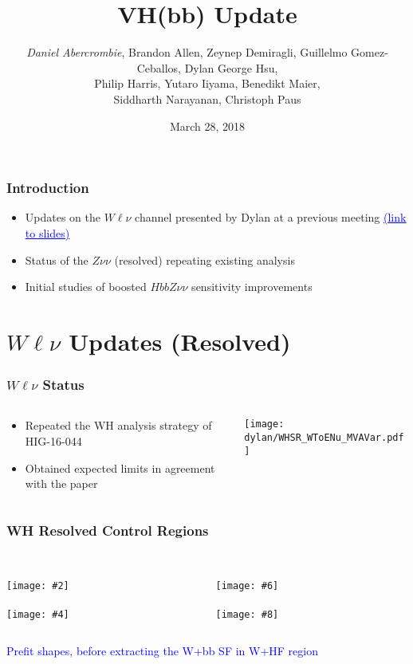 \documentclass{beamer}
\author[D. Abercrombie]{
  \emph{Daniel Abercrombie}, Brandon Allen, Zeynep Demiragli,
  Guillelmo Gomez-Ceballos, Dylan George Hsu, \\
  Philip Harris, Yutaro Iiyama, Benedikt Maier, \\
  Siddharth Narayanan, Christoph Paus
}
\title{\bf \sffamily VH(bb) Update}
\date{March 28, 2018}
\newcommand{\link}[2]{\href{#2}{\textcolor{blue}{\underline{#1}}}}
\newcommand{\wfourfigs}[8]{
  \begin{columns}
    \begin{column}{0.45\linewidth}
      \centering
      \textcolor{blue}{#1} \\
      \texttt{[image: \#2]} \\
      \textcolor{blue}{#3} \\
      \texttt{[image: \#4]}
    \end{column}
    \begin{column}{0.45\linewidth}
      \centering
      \textcolor{blue}{#5} \\
      \texttt{[image: \#6]} \\
      \textcolor{blue}{#7} \\
      \texttt{[image: \#8]}
    \end{column}
  \end{columns}
}
\begin{document}
\begin{frame}[nonumbering]
  \titlepage

\end{frame}

\begin{frame}
  \frametitle{Introduction}
  \begin{itemize}
  \item Updates on the $W\ell\nu$ channel presented by Dylan at a previous meeting
    \link{(link to slides)}{https://indico.cern.ch/event/690727/contributions/2890780/attachments/1603908/2545128/2018-02-21_statusReportVH.pdf}
  \item Status of the $Z\nu\nu$ (resolved) repeating existing analysis
  \item Initial studies of boosted $HbbZ\nu\nu$ sensitivity improvements
  \end{itemize}
\end{frame}

\section{$W\ell\nu$ Updates (Resolved)}

\begin{frame}
  \frametitle{$W\ell\nu$ Status}

  \begin{columns}
    \begin{column}{0.4\linewidth}
      \begin{itemize}
      \item Repeated the WH analysis strategy of HIG-16-044
      \item Obtained expected limits in agreement with the paper
      \end{itemize}
    \end{column}
    \begin{column}{0.6\linewidth}
      \texttt{[image: dylan/WHSR\_WToENu\_MVAVar.pdf]}
    \end{column}
  \end{columns}

\end{frame}

\begin{frame}
  \frametitle{WH Resolved Control Regions}

  \wfourfigs{}{dylan/WH2TopCR_WToENu_MVAVar.pdf}
            {}{dylan/WHHeavyFlavorLowMassCR_WToMuNu_MVAVar.pdf}
            {}{dylan/WHLightFlavorCR_WToMuNu_MVAVar.pdf}
            {}{dylan/WHHeavyFlavorHighMassCR_WToENu_MVAVar.pdf}

  \centering
  \textcolor{blue}{Prefit shapes, before extracting the W+bb SF in W+HF region}
\end{frame}
\end{document}
